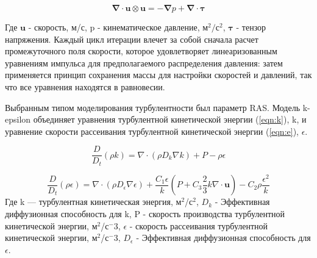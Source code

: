 \documentclass[10pt,a4paper]{book}
\begin{document}
    \begin{equation}\label{eqn:simpleFoam2}
        \bm{\nabla} \cdot \bm{u} \otimes \bm{u} = -\bm{\nabla} p + \bm{\nabla} \cdot \bm{\tau}
    \end{equation} 
    
    Где $\bm{u}$ - скорость, м/с, p - кинематическое давление, м$^{2}/$с$^{2}$, $\bm{\tau}$ - тензор напряжения. 
    Каждый цикл итерации влечет за собой сначала расчет промежуточного поля скорости, которое удовлетворяет линеаризованным уравнениям импульса для предполагаемого распределения давления: затем применяется принцип сохранения массы для настройки скоростей и давлений, так что все уравнения находятся в равновесии.
    
    
    Выбранным типом моделирования турбулентности был параметр RAS. Модель k-epsilon объединяет уравнения турбулентной кинетической энергии (\ref{eqn:k}), k, и уравнение скорости рассеивания турбулентной кинетической энергии (\ref{eqn:e}), $\epsilon$.
    
    \begin{equation}\label{eqn:k}
        \frac{D}{D_{t}}(\rho k) = \nabla \cdot (\rho D_{k}\nabla k) + P - \rho\epsilon
    \end{equation} 
    
    \begin{equation}\label{eqn:e}
        \frac{D}{D_{t}}(\rho\epsilon) = \nabla \cdot (\rho D_{\epsilon}\nabla\epsilon) + \frac{C_{1}\epsilon}{k}(P + C_{3}\frac{2}{3}k\nabla \cdot \bm{u}) - C_{2}\rho\frac{\epsilon^2}{k}
    \end{equation} 
    Где k --- турбулентная кинетическая энергия, м$^2$/с$^2$, $D_{k}$ - Эффективная диффузионная способность для k, P - скорость производства турбулентной кинетической энергии, м$^2$/с$^-3$, $\epsilon$ - скорость рассеивания турбулентной кинетической энергии, м$^2$/с$^-3$, $D_{\epsilon}$ - Эффективная диффузионная способность для $\epsilon$.
    
\end{document}
